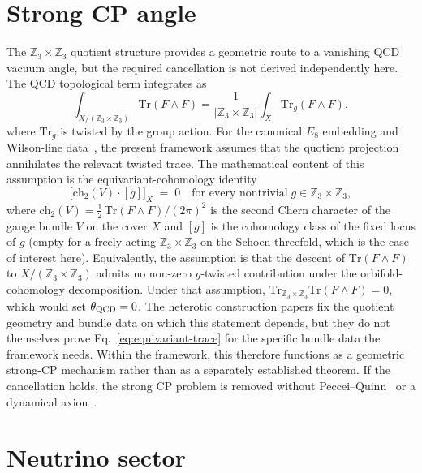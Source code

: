 ﻿\documentclass[reprint,amsmath,amssymb,aps,prd,longbibliography,floatfix]{revtex4-2}
\begin{document}
\section{Strong CP angle}
\label{sec:strongCP}

The $\mathbb{Z}_3 \times \mathbb{Z}_3$ quotient structure provides a
geometric route to a vanishing QCD vacuum angle, but the required
cancellation is not derived independently here. The QCD
topological term integrates as
\begin{equation}
\int_{X/(\mathbb{Z}_3 \times \mathbb{Z}_3)} \text{Tr}(F \wedge F)
= \frac{1}{|\mathbb{Z}_3 \times \mathbb{Z}_3|} \int_X
\text{Tr}_g(F \wedge F),
\end{equation}
where $\text{Tr}_g$ is twisted by the group action. For the canonical
$E_8$ embedding and Wilson-line data~\cite{BraunHeOvrutPantev2005,
DonagiOvrut2005}, the present framework assumes that the quotient
projection annihilates the relevant twisted trace. The mathematical
content of this assumption is the equivariant-cohomology identity
\begin{equation}
\bigl[\text{ch}_2(V) \cdot [g]\bigr]_X \;=\; 0
\quad \text{for every nontrivial}\; g \in \mathbb{Z}_3 \times \mathbb{Z}_3,
\label{eq:equivariant-trace}
\end{equation}
where $\text{ch}_2(V) = \tfrac{1}{2}\,\text{Tr}(F \wedge F)/(2\pi)^2$
is the second Chern character of the gauge bundle $V$ on the cover
$X$ and $[g]$ is the cohomology class of the fixed locus of $g$
(empty for a freely-acting $\mathbb{Z}_3 \times \mathbb{Z}_3$ on the
Schoen threefold, which is the case of interest here).
Equivalently, the assumption is that the descent of $\text{Tr}(F \wedge F)$
to $X/(\mathbb{Z}_3 \times \mathbb{Z}_3)$ admits no non-zero
$g$-twisted contribution under the orbifold-cohomology
decomposition. Under that assumption,
$\text{Tr}_{\mathbb{Z}_3 \times \mathbb{Z}_3} \text{Tr}(F \wedge F) = 0$,
which would set $\theta_{\rm QCD} = 0$. The heterotic construction papers fix
the quotient geometry and bundle data on which this statement depends,
but they do not themselves prove
Eq.~\eqref{eq:equivariant-trace} for the specific bundle data the
framework needs. Within the
framework, this therefore functions as a geometric strong-CP mechanism
rather than as a separately established theorem. If the cancellation
holds, the strong CP problem is removed without Peccei--Quinn~\cite{PecceiQuinn1977}
or a dynamical axion~\cite{KimCarosi2010}.

\section{Neutrino sector}
\label{sec:neutrinos}
\end{document}
